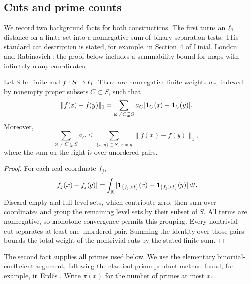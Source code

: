 

\subsection{Cuts and prime counts}

We record two background facts for both constructions. The first turns
an $\ell_1$ distance on a finite set into a nonnegative sum of binary
separation tests. This standard cut description is stated, for example,
in Section~4 of Linial, London and Rabinovich
\cite{LinialLondonRabinovich1995}; the proof below includes a summability
bound for maps with infinitely many coordinates.

\begin{lemma}\label{lem:cuts}
Let $S$ be finite and $f:S\to\ell_1$. There are nonnegative finite
weights $a_C$, indexed by nonempty proper subsets $C\subset S$, such that
\[
 \|f(x)-f(y)\|_1
 =\sum_{\varnothing\ne C\subsetneq S}
 a_C|\mathbf 1_C(x)-\mathbf 1_C(y)|.
\]
Moreover,
\[
 \sum_{\varnothing\ne C\subsetneq S}a_C
 \leq\sum_{\{x,y\}\subset S,\ x\ne y}\|f(x)-f(y)\|_1,
\]
where the sum on the right is over unordered pairs.
\end{lemma}
\begin{proof}
For each real coordinate $f_j$,
\[
 |f_j(x)-f_j(y)|
 =\int_{\mathbb R}|\mathbf 1_{\{f_j>t\}}(x)-\mathbf 1_{\{f_j>t\}}(y)|\,dt.
\]
Discard empty and full level sets, which contribute zero, then sum over
coordinates and group the remaining level sets by their subset of $S$.
All terms are nonnegative, so monotone convergence permits this
grouping. Every nontrivial cut separates at least one unordered pair.
Summing the identity over those pairs bounds the total weight of the
nontrivial cuts by the stated finite sum.
\end{proof}

The second fact supplies all primes used below. We use the elementary
binomial-coefficient argument, following the classical prime-product
method found, for example, in Erd\H{o}s \cite{Erdos1932}. Write $\pi(x)$
for the number of primes at most $x$.

